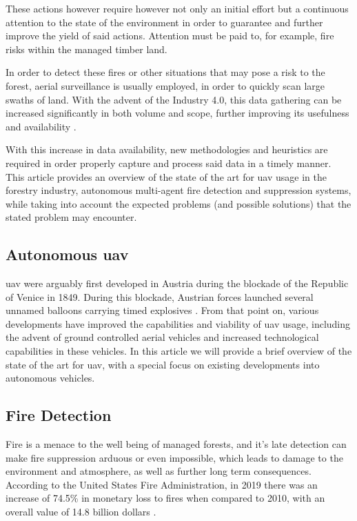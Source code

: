 \documentclass[runningheads]{llncs}
\begin{document}
These actions however require however not only an initial effort but a continuous attention to the state of the environment in order to guarantee and further improve the yield of said actions. Attention must be paid to, for example, fire risks within the managed timber land.

In order to detect these fires or other situations that may pose a risk to the forest, aerial surveillance is usually employed, in order to quickly scan large swaths of land. With the advent of the Industry 4.0, this data gathering can be increased significantly in both volume and scope, further improving its usefulness and availability \cite{Hood_Brady_2016}.

With this increase in data availability, new methodologies and heuristics are required in order properly capture and process said data in a timely manner. This article provides an overview of the state of the art for \acrshort{uav} usage in the forestry industry, autonomous multi-agent fire detection and suppression systems, while taking into account the expected problems (and possible solutions) that the stated problem may encounter.

\subsection{Autonomous \acrshort{uav}}

\acrshort{uav} were arguably first developed in Austria during the blockade of the Republic of Venice in 1849. During this blockade, Austrian forces launched several unnamed balloons carrying timed explosives \cite{Custers_2016}. From that point on, various developments have improved the capabilities and viability of \acrshort{uav} usage, including the advent of ground controlled aerial vehicles and increased technological capabilities in these vehicles. In this article we will provide a brief overview of the state of the art for \acrshort{uav}, with a special focus on existing developments into autonomous vehicles.

\subsection{Fire Detection}

Fire is a menace to the well being of managed forests, and it's late detection can make fire suppression arduous or even impossible, which leads to damage to the environment and atmosphere, as well as further long term consequences. According to the United States Fire Administration, in 2019 there was an increase of 74.5\% in monetary loss to fires when compared to 2010, with an overall value of 14.8 billion dollars \cite{USFA_2022}.
\end{document}
